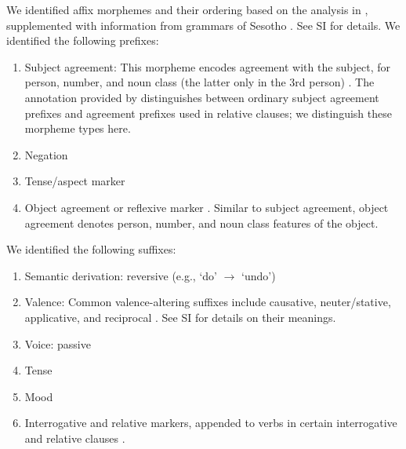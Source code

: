 We identified affix morphemes and their ordering based on the analysis in \cite{demuth1992acquisition}, supplemented with information from grammars of Sesotho \citep{doke1967textbook,guma1971outline}. See SI for details.
We identified the following prefixes:

\begin{enumerate}
    \item Subject agreement: This morpheme encodes agreement with the subject, for person, number, and noun class (the latter only in the 3rd person) \cite[]{doke1967textbook}.
	    The annotation provided by \cite{demuth1992acquisition} distinguishes between ordinary subject agreement prefixes and agreement prefixes used in relative clauses; we distinguish these morpheme types here.
    
    \item Negation \cite[]{doke1967textbook}
    
    \item Tense/aspect marker   \cite[--424]{doke1967textbook}
    
    \item Object agreement or reflexive marker \cite[]{doke1967textbook}. 
    Similar to subject agreement, object agreement denotes person, number, and noun class features of the object.
\end{enumerate}
We identified the following suffixes:

    
\begin{enumerate}
\item Semantic derivation: reversive (e.g., `do' $\rightarrow$ `undo') \cite[]{doke1967textbook}
\item Valence: Common valence-altering suffixes include causative, neuter/stative, applicative, and reciprocal \cite[--338]{doke1967textbook}. See SI for details on their meanings.
    \item Voice: passive \cite[]{doke1967textbook} 
    \item Tense \cite[]{doke1967textbook}
    \item Mood \cite[--445]{doke1967textbook}
    \item Interrogative and relative markers, appended to verbs in certain interrogative and relative clauses \cite[, 271, 320, 714, 793]{doke1967textbook}.
\end{enumerate}



